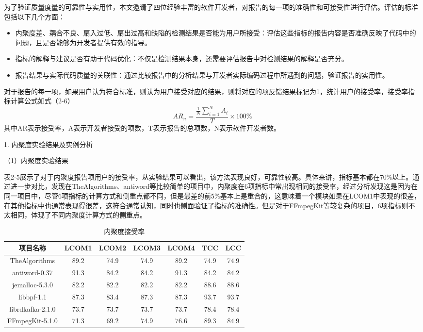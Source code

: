 为了验证质量度量的可靠性与实用性，本文邀请了四位经验丰富的软件开发者，对报告的每一项的准确性和可接受性进行评估。评估的标准包括以下几个方面：

\begin{itemize}
    \item 内聚度差、耦合不良、扇入过低、扇出过高和缺陷的检测结果是否能为用户所接受：评估这些指标的报告内容是否准确反映了代码中的问题，且是否能够为开发者提供有效的指导。
    \item 指标的解释与建议是否有助于代码优化：不仅是检测结果本身，还需要评估报告中对检测结果的解释是否充分。
    \item 报告结果与实际代码质量的关联性：通过比较报告中的分析结果与开发者实际编码过程中所遇到的问题，验证报告的实用性。
\end{itemize}

对于报告的每一项，如果用户认为符合标准，则认为用户接受对应的结果，则将对应的项反馈结果标记为1，统计用户的接受率，接受率指标计算公式如式（2-6）
\begin{equation}
    AR_n =  \frac{\frac{1}{N} \sum_{i=1}^{N} A_i}{T} \times 100\%
    \end{equation}
其中AR表示接受率，A表示开发者接受的项数，T表示报告的总项数，N表示软件开发者数。

1. 内聚度实验结果及实例分析

（1）内聚度实验结果

表2-5展示了对于内聚度报告项用户的接受率，从实验结果可以看出，该方法表现良好，可靠性较高。具体来讲，指标基本都在70\%以上。通过进一步对比，发现在TheAlgorithms、antiword等比较简单的项目中，内聚度在6项指标中常出现相同的接受率，经过分析发现这是因为在同一项目中，尽管6项指标的计算方式和侧重点都不同，但是最差的前5\%基本上是重合的，这意味着一个模块如果在LCOM1中表现的很差，在其他指标中也通常表现得很差，这符合通常认知，同时也侧面验证了指标的准确性。但是对于FFmpegKit等较复杂的项目，6项指标则不太相同，体现了不同内聚度计算方式的侧重点。

\begin{table}[htbp]
\caption{内聚度接受率}
\vspace{0.5em}\centering\wuhao
\begin{tabular}{ccccccc}
\toprule
项目名称 & LCOM1 & LCOM2 & LCOM3 & LCOM4 & TCC & LCC \\
\midrule
TheAlgorithms & 89.2 & 74.9 & 74.9 & 89.2 & 74.9 & 74.9 \\
antiword-0.37  & 91.3 & 84.2 & 84.2 & 91.3 & 84.2 & 84.2 \\
jemalloc-5.3.0 & 82.2 & 82.2 & 82.2 & 82.2 & 88.6 & 88.6 \\
libbpf-1.1 & 87.3 & 83.4 & 87.3 & 87.3 & 93.7 &  93.7 \\
librdkafka-2.1.0 & 73.7 & 73.7 & 73.7 & 73.7 & 78.4 & 78.4 \\
FFmpegKit-5.1.0 & 71.3 & 69.2 & 74.9 & 76.6 & 89.3 & 84.9 \\

\bottomrule
\end{tabular}
\end{table}


